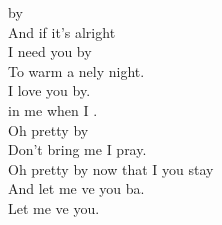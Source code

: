  by \\
And if it's  alright \\
I need you by \\
To warm a nely night. \\
I love you by.\\
 in me when I . \songwordfb{} \\

Oh pretty by\\
Don't bring me  I pray.\\
Oh pretty by now that I  you stay \\
And let me ve you ba.\\
Let me ve you. 
\songwordfb{} \\
